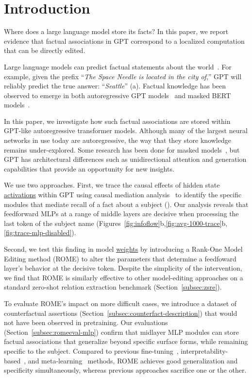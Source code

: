 \section{Introduction}

Where does a large language model store its facts? In this paper, we report evidence that factual associations in GPT correspond to a localized computation that can be directly edited.


Large language models can predict factual statements about the world~\citep{petroni-etal-2019-language,jiang-etal-2020-know,roberts-etal-2020-much}. For example, given the prefix ``\emph{The Space Needle is located in the city of},'' GPT will reliably predict the true answer: ``\emph{Seattle}'' (a).  Factual knowledge has been observed to emerge in both autoregressive GPT models~\citep{gpt2,gpt3} and masked BERT models~\citep{devlin-etal-2019-bert}.

In this paper, we investigate how such factual associations are stored within GPT-like autoregressive transformer models. Although many of the largest neural networks in use today are autoregressive, the way that they store knowledge remains under-explored. Some research has been done for masked models~\citep{petroni-etal-2019-language,jiang-etal-2020-know,10.1162/tacl_a_00410,geva-etal-2021-transformer,dai-kn,decao-ke}, but GPT has architectural differences such as unidirectional attention and generation capabilities that provide an opportunity for new insights.

We use two approaches. First, we trace the causal effects of hidden state \underline{activations} within GPT using causal mediation analysis~\citep{pearl2001direct,vig2020investigating} to identify the specific modules that mediate recall of a fact about a subject ().  Our analysis reveals that feedforward MLPs at a range of middle layers are decisive when processing the last token of the subject name (Figures~\ref{fig:infoflow}b,\ref{fig:avg-1000-trace}b,\ref{fig:trace-mlp-disabled}).

Second, we test this finding in model \underline{weights} by introducing a Rank-One Model Editing method (ROME) to alter the parameters that determine a feedfoward layer's behavior at the decisive token.  Despite the simplicity of the intervention, we find that ROME is similarly effective to other model-editing approaches on a standard zero-shot relation extraction benchmark (Section~\ref{subsec:zsre}).

To evaluate ROME's impact on more difficult cases, we introduce a dataset of counterfactual assertions (Section~\ref{subsec:counterfact-description}) that would not have been observed in pretraining. Our evaluations (Section~\ref{subsec:romeeval-mlp}) confirm that midlayer MLP modules can store factual associations that generalize beyond specific surface forms, while remaining specific to the subject. Compared to previous fine-tuning~\citep{zhu-ft}, interpretability-based~\citep{dai-kn}, and meta-learning~\citep{mend,decao-ke} methods, ROME achieves good generalization and specificity simultaneously, whereas previous approaches sacrifice one or the other.
